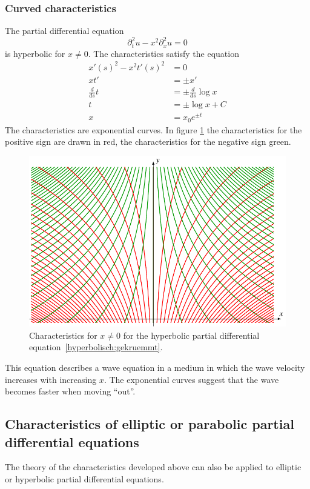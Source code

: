 \subsubsection{Curved characteristics}
The partial differential equation
\begin{equation}
\partial_t^2u-x^2\partial_x^2u=0
\label{hyperbolisch:gekruemmt}
\end{equation}
is hyperbolic for $x\ne 0$.
The characteristics satisfy the equation
\begin{align*}
x'(s)^2-x^2t'(s)^2&=0
\\
xt'&=\pm  x'
\\
\frac{d}{ds}t&=\pm\frac{d}{ds}\log x
\\
t&=\pm\log x+C
\\
x&=x_0e^{\pm t}
\end{align*}
The characteristics are exponential curves.
In figure \ref{hyp:exp}
the characteristics for the positive sign are drawn in red,
the characteristics for the negative sign green.
\begin{figure}
\centering
\includegraphics{9-hyperbolic/images/exponential.pdf}
\caption{Characteristics for $x\ne 0$ for the hyperbolic partial
differential equation~\eqref{hyperbolisch:gekruemmt}.
\label{hyp:exp}}
\end{figure}

This equation describes a wave equation in a medium in which
the wave velocity increases with increasing $x$.
The exponential curves suggest that the wave becomes faster when moving ``out''.

\subsection{Characteristics of elliptic or parabolic partial differential
equations}
The theory of the characteristics developed above can also be
applied to elliptic or hyperbolic partial differential equations.

